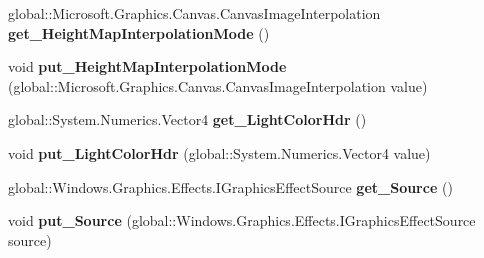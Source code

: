 \begin{DoxyCompactItemize}
\item 
\mbox{\label{interface_microsoft_1_1_graphics_1_1_canvas_1_1_effects_1_1_i_distant_specular_effect_a2c715c4d8c2ff0dea3a3da536a3002f6}} 
global\+::\+Microsoft.\+Graphics.\+Canvas.\+Canvas\+Image\+Interpolation {\bfseries get\+\_\+\+Height\+Map\+Interpolation\+Mode} ()
\item 
\mbox{\label{interface_microsoft_1_1_graphics_1_1_canvas_1_1_effects_1_1_i_distant_specular_effect_a9a73beff7c6063c0808c4b7486fb5c80}} 
void {\bfseries put\+\_\+\+Height\+Map\+Interpolation\+Mode} (global\+::\+Microsoft.\+Graphics.\+Canvas.\+Canvas\+Image\+Interpolation value)
\item 
\mbox{\label{interface_microsoft_1_1_graphics_1_1_canvas_1_1_effects_1_1_i_distant_specular_effect_acf70c6c7ccebad1828a9e006410aaaa9}} 
global\+::\+System.\+Numerics.\+Vector4 {\bfseries get\+\_\+\+Light\+Color\+Hdr} ()
\item 
\mbox{\label{interface_microsoft_1_1_graphics_1_1_canvas_1_1_effects_1_1_i_distant_specular_effect_aac0c769cb8dbf6e69fceb0fb77241782}} 
void {\bfseries put\+\_\+\+Light\+Color\+Hdr} (global\+::\+System.\+Numerics.\+Vector4 value)
\item 
\mbox{\label{interface_microsoft_1_1_graphics_1_1_canvas_1_1_effects_1_1_i_distant_specular_effect_a87a9af882ea550892ab67d228de612ba}} 
global\+::\+Windows.\+Graphics.\+Effects.\+I\+Graphics\+Effect\+Source {\bfseries get\+\_\+\+Source} ()
\item 
\mbox{\label{interface_microsoft_1_1_graphics_1_1_canvas_1_1_effects_1_1_i_distant_specular_effect_a4f32a5fdd09ffbd96ece9a3279e3d004}} 
void {\bfseries put\+\_\+\+Source} (global\+::\+Windows.\+Graphics.\+Effects.\+I\+Graphics\+Effect\+Source source)
\item 

\end{DoxyCompactItemize}
